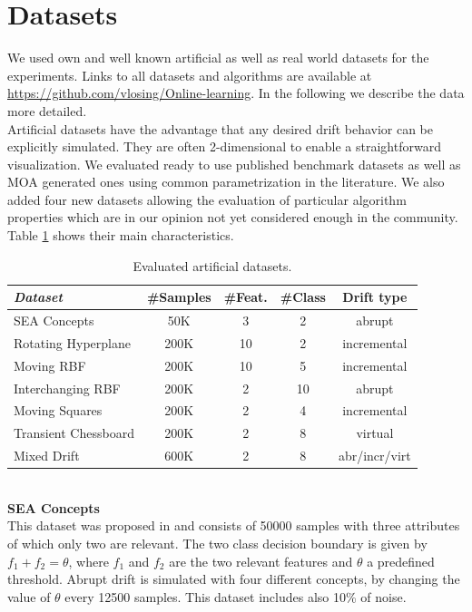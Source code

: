 \documentclass[conference]{IEEEtran}
\begin{document}
\section{Datasets}
We used own and well known artificial as well as real world datasets for the experiments.
Links to all datasets and algorithms are available at \url{https://github.com/vlosing/Online-learning}. 
In the following we describe the data more detailed.\\

Artificial datasets have the advantage that any desired drift behavior can be explicitly simulated. They are often 
2-dimensional to enable a straightforward visualization. We evaluated ready to use published benchmark datasets as well as MOA generated ones using common parametrization in the literature.
We also added four new datasets allowing the evaluation of particular algorithm properties which are in our opinion not yet considered enough in the community. 
Table \ref{tab:artDatasets} shows their main characteristics.
\begin{table}
\caption{Evaluated artificial datasets.}
\label{tab:artDatasets}
\centering
\begin{tabular}{l|cccc}
\textit{Dataset} & \#Samples&\#Feat.&\#Class&Drift type\\\hline
SEA Concepts & 50K & 3 & 2 & abrupt\\
Rotating Hyperplane & 200K & 10 & 2 & incremental\\
Moving RBF & 200K & 10 & 5 & incremental\\
Interchanging RBF & 200K & 2 & 10 & abrupt\\
Moving Squares & 200K & 2 & 4 & incremental\\
Transient Chessboard & 200K & 2 & 8 & virtual\\
Mixed Drift & 600K & 2 & 8 & abr/incr/virt\\
\end{tabular}
\end{table}
\\\textbf{SEA Concepts}\\
This dataset was proposed in \cite{Street:2001:SEA:502512.502568} and consists of 50000 samples with three attributes of which only two are relevant.
The two class decision boundary is given by $f_1 + f_2 = \theta$, where $f_1$ and $f_2$ are the two relevant features and $\theta$ a predefined threshold.
Abrupt drift is simulated with four different concepts, by changing the value of $\theta$ every 12500 samples.
This dataset includes also 10\% of noise.\\
\end{document}
